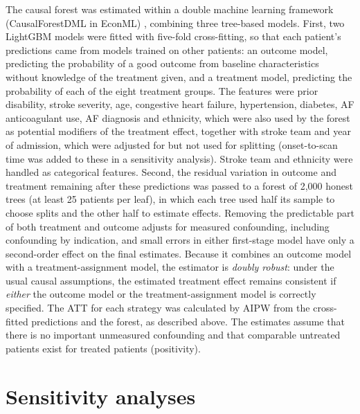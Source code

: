 The causal forest was estimated within a double machine learning framework (CausalForestDML in EconML) , combining three tree-based models. First, two LightGBM models  were fitted with five-fold cross-fitting, so that each patient's predictions came from models trained on other patients: an outcome model, predicting the probability of a good outcome from baseline characteristics without knowledge of the treatment given, and a treatment model, predicting the probability of each of the eight treatment groups. The features were prior disability, stroke severity, age, congestive heart failure, hypertension, diabetes, AF anticoagulant use, AF diagnosis and ethnicity, which were also used by the forest as potential modifiers of the treatment effect, together with stroke team and year of admission, which were adjusted for but not used for splitting (onset-to-scan time was added to these in a sensitivity analysis). Stroke team and ethnicity were handled as categorical features. Second, the residual variation in outcome and treatment remaining after these predictions was passed to a forest of 2,000 honest trees (at least 25 patients per leaf), in which each tree used half its sample to choose splits and the other half to estimate effects. Removing the predictable part of both treatment and outcome adjusts for measured confounding, including confounding by indication, and small errors in either first-stage model have only a second-order effect on the final estimates. Because it combines an outcome model with a treatment-assignment model, the estimator is \textit{doubly robust}: under the usual causal assumptions, the estimated treatment effect remains consistent if \textit{either} the outcome model or the treatment-assignment model is correctly specified. The ATT for each strategy was calculated by AIPW from the cross-fitted predictions and the forest, as described above. The estimates assume that there is no important unmeasured confounding and that comparable untreated patients exist for treated patients (positivity).


\newpage

\section{Sensitivity analyses}
\label{sec:sensitivity}

